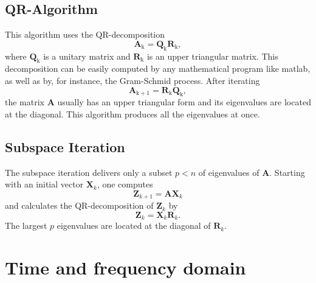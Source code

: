 \documentclass[conference]{journal}
\newcommand{\bb}[1]{\mathbb{#1}}
\newcommand{\B}[1]{\mathbf{#1}}
\newcommand{\Bx}{\B{x}}
\newcommand{\M}{\bb{M}}
\newcommand{\C}{\bb{C}}
\newcommand{\K}{\bb{K}}
\begin{document}
	\subsection*{QR-Algorithm}
	This algorithm uses the QR-decomposition
	\begin{equation}
	\textbf{A}_\mathrm{k}={\textbf{Q}_\mathrm{k}}{\textbf{R}_\mathrm{k}},
	\end{equation}
	where $\textbf{Q}_\mathrm{k}$ is a unitary matrix and $\textbf{R}_\mathrm{k}$ is an upper triangular matrix.
	This decomposition can be easily computed by any mathematical program like matlab, as well as by, for instance, the Gram-Schmid process. After iterating
	\begin{equation}
	\textbf{A}_\mathrm{k+1}={\textbf{R}_\mathrm{k}}{\textbf{Q}_\mathrm{k}},
	\end{equation}
	the matrix $\textbf{A}$ usually has an upper triangular form and its eigenvalues are located at the diagonal. This algorithm produces all the eigenvalues at once.
	 
	\subsection*{Subspace Iteration}
	The subspace iteration delivers only a subset $p<n$ of eigenvalues of $\textbf{A}$. Starting with an initial vector $\textbf{X}_k$, one computes
	\begin{equation}
	\textbf{Z}_{k+1}=\textbf{AX}_k
	\end{equation}
	and calculates the QR-decomposition of $\textbf{Z}_k$ by
	\begin{equation}
	\textbf{Z}_k=\textbf{X}_k\textbf{R}_k.
	\end{equation}
	The largest $p$ eigenvalues are located at the diagonal of $\textbf{R}_k$.
	
	
	
	\section{Time and frequency domain}
\end{document}
